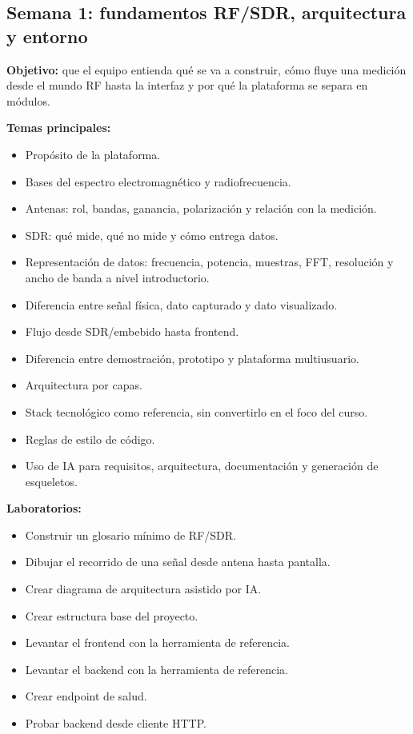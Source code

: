 \documentclass[11pt,a4paper]{article}
\begin{document}
\subsection*{Semana 1: fundamentos RF/SDR, arquitectura y entorno}

\textbf{Objetivo:} que el equipo entienda qué se va a construir, cómo fluye una medición desde el mundo RF hasta la interfaz y por qué la plataforma se separa en módulos.

\textbf{Temas principales:}

\begin{itemize}
  \item Propósito de la plataforma.
  \item Bases del espectro electromagnético y radiofrecuencia.
  \item Antenas: rol, bandas, ganancia, polarización y relación con la medición.
  \item SDR: qué mide, qué no mide y cómo entrega datos.
  \item Representación de datos: frecuencia, potencia, muestras, FFT, resolución y ancho de banda a nivel introductorio.
  \item Diferencia entre señal física, dato capturado y dato visualizado.
  \item Flujo desde SDR/embebido hasta frontend.
  \item Diferencia entre demostración, prototipo y plataforma multiusuario.
  \item Arquitectura por capas.
  \item Stack tecnológico como referencia, sin convertirlo en el foco del curso.
  \item Reglas de estilo de código.
  \item Uso de IA para requisitos, arquitectura, documentación y generación de esqueletos.
\end{itemize}

\textbf{Laboratorios:}

\begin{itemize}
  \item Construir un glosario mínimo de RF/SDR.
  \item Dibujar el recorrido de una señal desde antena hasta pantalla.
  \item Crear diagrama de arquitectura asistido por IA.
  \item Crear estructura base del proyecto.
  \item Levantar el frontend con la herramienta de referencia.
  \item Levantar el backend con la herramienta de referencia.
  \item Crear endpoint de salud.
  \item Probar backend desde cliente HTTP.
\end{itemize}
\end{document}
